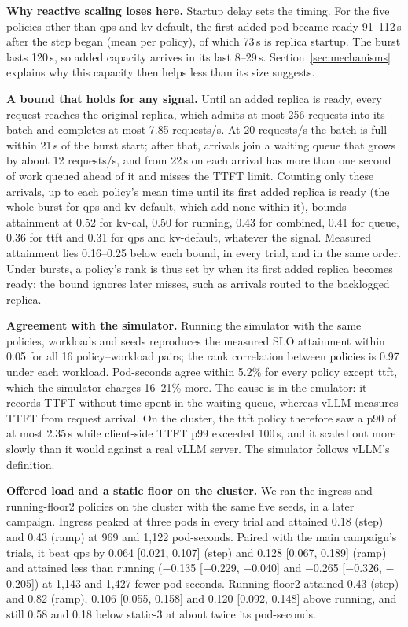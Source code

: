 \documentclass[10pt,conference]{IEEEtran}
\begin{document}
\textbf{Why reactive scaling loses here.} Startup delay sets the timing. For the
five policies other than qps and kv-default, the first added pod became ready
91--112\,s after the step began (mean per policy), of which 73\,s is replica
startup. The burst lasts 120\,s, so added capacity arrives in its last
8--29\,s. Section~\ref{sec:mechanisms} explains why this capacity then
helps less than its size suggests.

\textbf{A bound that holds for any signal.}
Until an added replica is ready, every request reaches the original replica,
which admits at most 256 requests into its batch and completes at most
7.85 requests/s. At 20 requests/s the batch is full within 21\,s of the burst
start; after that, arrivals join a waiting queue that grows by about
12 requests/s, and from 22\,s on each arrival has more than one second of
work queued ahead of it and misses the TTFT limit. Counting only these
arrivals, up to each policy's mean time until its first added replica is
ready (the whole burst for qps and kv-default, which add none within it),
bounds attainment at 0.52 for kv-cal, 0.50 for running, 0.43 for combined,
0.41 for queue, 0.36 for ttft and 0.31 for qps and kv-default, whatever the
signal. Measured attainment lies 0.16--0.25 below each bound, in every trial,
and in the same order. Under bursts, a policy's rank is thus set by when its
first added replica becomes ready; the bound ignores later misses, such as
arrivals routed to the backlogged replica.

\textbf{Agreement with the simulator.} Running the simulator with the same
policies, workloads and seeds reproduces the measured SLO attainment within
0.05 for all 16 policy--workload pairs; the rank correlation between policies is
0.97 under each workload. Pod-seconds agree within 5.2\% for every policy except
ttft, which the simulator charges 16--21\% more. The cause is in the emulator:
it records TTFT without time spent in the waiting queue, whereas vLLM measures
TTFT from request arrival. On the cluster, the ttft policy therefore saw a p90
of at most 2.35\,s while client-side TTFT p99 exceeded 100\,s, and it scaled out
more slowly than it would against a real vLLM server. The simulator follows
vLLM's definition.

\textbf{Offered load and a static floor on the cluster.}
We ran the ingress and running-floor2 policies on the cluster with the same
five seeds, in a later campaign. Ingress peaked at three pods in every trial
and attained 0.18 (step) and 0.43 (ramp) at 969 and 1{,}122 pod-seconds.
Paired with the main campaign's trials, it beat qps by 0.064 [0.021, 0.107]
(step) and 0.128 [0.067, 0.189] (ramp) and attained less than running
($-$0.135 [$-$0.229, $-$0.040] and $-$0.265 [$-$0.326, $-$0.205]) at
1{,}143 and 1{,}427 fewer pod-seconds. Running-floor2 attained 0.43 (step)
and 0.82 (ramp), 0.106 [0.055, 0.158] and 0.120 [0.092, 0.148] above running,
and still 0.58 and 0.18 below static-3 at about twice its pod-seconds.
\end{document}
